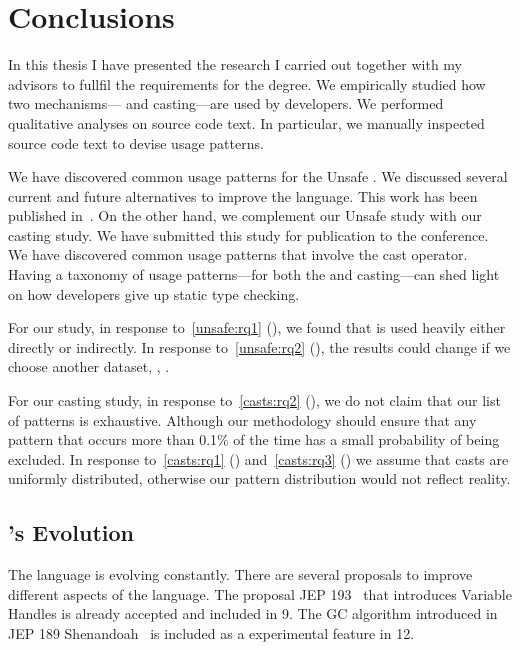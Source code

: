 \chapter{Conclusions}
\label{cha:conclusions}

In this thesis I have presented the research I carried out together with my advisors to fullfil the requirements for the \phd{} degree.
We empirically studied how two mechanisms---\unsafe{} \api{} and casting---are used by \java{} developers.
We performed qualitative analyses on source code text.
In particular, we manually inspected source code text to devise usage patterns.

We have discovered common usage patterns for the \java{} Unsafe \api{}.
We discussed several current and future alternatives to improve the
\java{} language.
This work has been published in~\citep{mastrangeloUseYourOwn2015}.
On the other hand, we complement our Unsafe \api{} study with 
our casting study.
We have submitted this study for publication to the  conference.
We have discovered common usage patterns that involve the cast operator.
Having a taxonomy of usage patterns---for both the \unsafe{} \api{} and casting---can shed light on how \java{} developers give up static type checking.

For our \unsafe{} study,
in response to~\ref{unsafe:rq1} (\urqA{}),
we found that \smu{} is used heavily either directly or indirectly.
In response to~\ref{unsafe:rq2} (\urqB{}),
the results could change if we choose another dataset, \eg{},
\github{}.

For our casting study, in response to~\ref{casts:rq2} (\crqB{}),
we do not claim that our list of patterns is exhaustive.
Although our methodology should ensure that any pattern that occurs more
than 0.1\% of the time has a small probability of being excluded.
In response to~\ref{casts:rq1} (\crqA{}) and~\ref{casts:rq3} (\crqC{})
we assume that casts are uniformly distributed,
otherwise our pattern distribution would not reflect reality.

\section{\java{}'s Evolution}

The \java{} language is evolving constantly.
There are several proposals to improve different aspects of the language.
The proposal JEP 193~\citep{jep193} that introduces Variable Handles is already accepted and included in \java{} 9.
The GC algorithm introduced in JEP 189 Shenandoah~\citep{jep189} is included as a experimental feature in \java{} 12.

